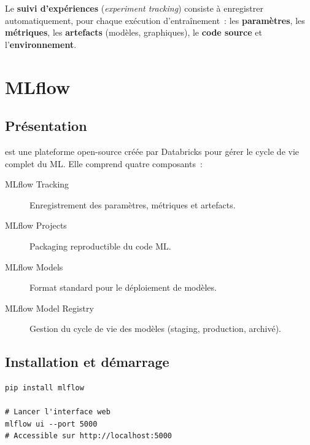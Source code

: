 \begin{definition}
Le \textbf{suivi d'exp\'eriences} (\emph{experiment tracking}) consiste \`a
enregistrer automatiquement, pour chaque ex\'ecution d'entra\^inement~:
les \textbf{param\`etres}, les \textbf{m\'etriques}, les \textbf{artefacts}
(mod\`eles, graphiques), le \textbf{code source} et l'\textbf{environnement}.
\end{definition}

\section{MLflow}
\label{sec:mlflow}


\subsection{Pr\'esentation}

 est une plateforme open-source cr\'e\'ee par Databricks pour
g\'erer le cycle de vie complet du ML. Elle comprend quatre composants~:

\begin{formules}[title=\textbf{Composants de MLflow}]
\begin{description}
  \item[MLflow Tracking] Enregistrement des param\`etres, m\'etriques et artefacts.
  \item[MLflow Projects] Packaging reproductible du code ML.
  \item[MLflow Models] Format standard pour le d\'eploiement de mod\`eles.
  \item[MLflow Model Registry] Gestion du cycle de vie des mod\`eles
    (staging, production, archiv\'e).
\end{description}
\end{formules}

\subsection{Installation et d\'emarrage}

\begin{codeblock}[title=\textbf{Installation de MLflow}]
\begin{verbatim}
pip install mlflow

# Lancer l'interface web
mlflow ui --port 5000
# Accessible sur http://localhost:5000
\end{verbatim}
\end{codeblock}


